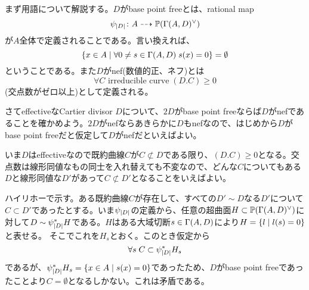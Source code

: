 \begin{rem}
  まず用語について解説する。$D$がbase point freeとは、rational map
  \[
  \psi_{\left \lvert D \right \rvert} \colon A \dashrightarrow {\mathbb P} ( {\Gamma} (A, D)^{\vee} )
  \]
  が$A$全体で定義されることである。言い換えれば、
  \[
  \left\{ x \in A \mathrel{} \middle| \mathrel{}  \forall  0 \neq s \in {\Gamma}(A,D) \; s(x)=0  \right\} = \emptyset
  \]
  ということである。また$D$がnef(数値的正、ネフ)とは
\[
\forall C \text{ irreducible curve} \; (D.C) \geq 0
\]
(交点数がゼロ以上)として定義される。

さてeffectiveなCartier divisor $D$について、$2D$がbase point freeならば$D$がnefであることを確かめよう。$2D$がnefならあきらかに$D$もnefなので、はじめから$D$がbase point freeだと仮定して$D$がnefだといえばよい。

いま$D$はeffectiveなので既約曲線$C$が$C \not\subset D$である限り、$(D.C) \geq 0$となる。交点数は線形同値なもの同士を入れ替えても不変なので、どんな$C$についてもある$D$と線形同値な$D'$があって$C \not\subset D'$となることをいえばよい。

ハイリホーで示す。ある既約曲線$C$が存在して、すべての$D' \sim D$なる$D'$について$C \subset D'$であったとする。いま$\psi_{\left \lvert D \right \rvert}$の定義から、任意の超曲面$H \subset {\mathbb P} ( {\Gamma} (A, D)^{\vee} )$に対して$D \sim \psi_{\left \lvert D \right \rvert}^* H$である。$H$はある大域切断$s \in {\Gamma}(A,D)$により$H = \left\{ l \mathrel{} \middle| \mathrel{} l(s) = 0 \right\}$と表せる。
そこでこれを$H_s$とおく。このとき仮定から
\[
\forall s \; C \subset \psi_{\left \lvert D \right \rvert}^* H_s
\]
であるが、$\psi_{\left \lvert D \right \rvert}^* H_s = \left\{ x \in A \mathrel{} \middle| \mathrel{} s(x)=0 \right\}$であったため、$D$がbase point freeであったことより$C = \emptyset$となるしかない。これは矛盾である。
\end{rem}
